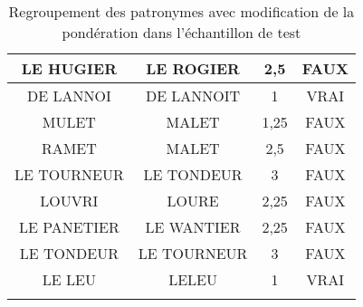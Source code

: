 \begin{center}
\begin{longtable}{|c|c|c|c|}
\hline	LE HUGIER	&	LE ROGIER	&	2,5	&	FAUX	\\
\hline	DE LANNOI	&	DE LANNOIT	&	1	&	VRAI	\\
\hline	MULET	&	MALET	&	1,25	&	FAUX	\\
\hline	RAMET	&	MALET	&	2,5	&	FAUX	\\
\hline	LE TOURNEUR	&	LE TONDEUR	&	3	&	FAUX	\\
\hline	LOUVRI	&	LOURE	&	2,25	&	FAUX	\\
\hline	LE PANETIER	&	LE WANTIER	&	2,25	&	FAUX	\\
\hline	LE TONDEUR	&	LE TOURNEUR	&	3	&	FAUX	\\
\hline	LE LEU	&	LELEU	&	1	&	VRAI	\\
\hline	
\caption{Regroupement des patronymes avec modification de la pondération dans l'échantillon de test}
\label{test_patro_md}
\end{longtable}
\end{center}
\normalsize